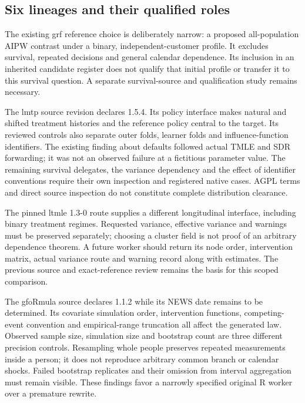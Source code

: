 \subsection{Six lineages and their qualified roles}
The existing grf reference choice is deliberately narrow: a proposed
all-population AIPW contrast under a binary, independent-customer profile.
It excludes survival, repeated decisions and general calendar dependence.
Its inclusion in an inherited candidate register does not qualify that
initial profile or transfer it to this survival question. A separate
survival-source and qualification study remains necessary. \citep{exec21_grf_reuse}

The lmtp source revision declares 1.5.4. Its policy interface makes natural
and shifted treatment histories and the reference policy central to the
target. Its reviewed controls also separate outer folds, learner folds and
influence-function identifiers. The existing finding about defaults followed
actual TMLE and SDR forwarding; it was not an observed failure at a fictitious
parameter value. The remaining survival delegates, the variance dependency
and the effect of identifier conventions require their own inspection and
registered native cases. AGPL terms and direct source inspection do not
constitute complete distribution clearance. \citep{exec22_lmtp_reuse}

The pinned ltmle 1.3-0 route supplies a different longitudinal interface,
including binary treatment regimes. Requested variance, effective variance
and warnings must be preserved separately; choosing a cluster field is not
proof of an arbitrary dependence theorem. A future worker should return its
node order, intervention matrix, actual variance route and warning record
along with estimates. The previous source and exact-reference review remains
the basis for this scoped comparison. \citep{exec23_ltmle_source,exec23_ltmle_exact}

The gfoRmula source declares 1.1.2 while its NEWS date remains to be determined.
Its covariate simulation order, intervention functions, competing-event
convention and empirical-range truncation all affect the generated law.
Observed sample size, simulation size and bootstrap count are three different
precision controls. Resampling whole people preserves repeated measurements
inside a person; it does not reproduce arbitrary common branch or calendar
shocks. Failed bootstrap replicates and their omission from interval
aggregation must remain visible. These findings favor a narrowly specified
original R worker over a premature rewrite. \citep{exec20_gformula_reuse,exec20_gformula_reference}

